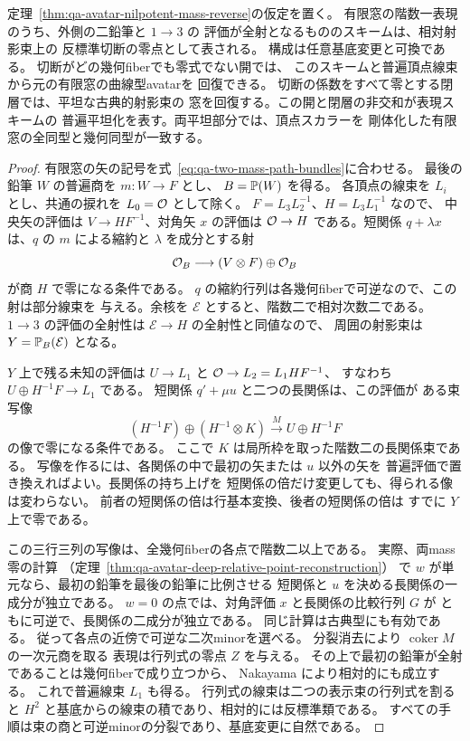 \begin{theorem}[冪零mass近傍の階数一表現と幾何復元]
\label{thm:qa-avatar-nilpotent-incidence}
定理~\ref{thm:qa-avatar-nilpotent-mass-reverse}の仮定を置く。
有限窓の階数一表現のうち、外側の二鉛筆と $1\to3$ の
評価が全射となるもののスキームは、相対射影束上の
反標準切断の零点として表される。
構成は任意基底変更と可換である。
切断がどの幾何fiberでも零式でない開では、
このスキームと普遍頂点線束から元の有限窓の曲線型avatarを
回復できる。
切断の係数をすべて零とする閉層では、平坦な古典的射影束の
窓を回復する。この開と閉層の非交和が表現スキームの
普遍平坦化を表す。両平坦部分では、頂点スカラーを
剛体化した有限窓の全同型と幾何同型が一致する。
\end{theorem}
\begin{proof}
有限窓の矢の記号を式~\eqref{eq:qa-two-mass-path-bundles}に合わせる。
最後の鉛筆 $W$ の普遍商を $m:W\to F$ とし、
$B=\mathbb P(W)$ を得る。
各頂点の線束を $L_i$ とし、共通の捩れを $L_0=\mathcal O$ として除く。
$F=L_3L_2^{-1}$、$H=L_3L_1^{-1}$ なので、
中央矢の評価は $V\to HF^{-1}$、対角矢 $x$ の評価は
$\mathcal O\to H$ である。短関係 $q+\lambda x$ は、$q$ の
$m$ による縮約と $\lambda$ を成分とする射
\[
 \mathcal O_B\longrightarrow (V\otimes F)\oplus\mathcal O_B
\]
が商 $H$ で零になる条件である。
$q$ の縮約行列は各幾何fiberで可逆なので、この射は部分線束を
与える。余核を $\mathcal E$ とすると、階数二で相対次数二である。
$1\to3$ の評価の全射性は $\mathcal E\to H$ の全射性と同値なので、
周囲の射影束は $Y=\mathbb P_B(\mathcal E)$ となる。

$Y$ 上で残る未知の評価は
$U\to L_1$ と $\mathcal O\to L_2=L_1HF^{-1}$、
すなわち $U\oplus H^{-1}F\to L_1$ である。
短関係 $q'+\mu u$ と二つの長関係は、この評価が
ある束写像
\[
 (H^{-1}F)\oplus(H^{-1}\otimes K)
 \xrightarrow{\ M\ } U\oplus H^{-1}F
\]
の像で零になる条件である。
ここで $K$ は局所枠を取った階数二の長関係束である。
写像を作るには、各関係の中で最初の矢または $u$ 以外の矢を
普遍評価で置き換えればよい。長関係の持ち上げを
短関係の倍だけ変更しても、得られる像は変わらない。
前者の短関係の倍は行基本変換、後者の短関係の倍は
すでに $Y$ 上で零である。

この三行三列の写像は、全幾何fiberの各点で階数二以上である。
実際、両mass零の計算
（定理~\ref{thm:qa-avatar-deep-relative-point-reconstruction}）
で $w$ が単元なら、最初の鉛筆を最後の鉛筆に比例させる
短関係と $u$ を決める長関係の一成分が独立である。
$w=0$ の点では、対角評価 $x$ と長関係の比較行列 $G$ が
ともに可逆で、長関係の二成分が独立である。
同じ計算は古典型にも有効である。
従って各点の近傍で可逆な二次minorを選べる。
分裂消去により $\operatorname{coker}M$ の一次元商を取る
表現は行列式の零点 $Z$ を与える。
その上で最初の鉛筆が全射であることは幾何fiberで成り立つから、
Nakayama により相対的にも成立する。
これで普遍線束 $L_1$ も得る。
行列式の線束は二つの表示束の行列式を割ると
$H^2$ と基底からの線束の積であり、相対的には反標準類である。
すべての手順は束の商と可逆minorの分裂であり、基底変更に自然である。


\end{proof}
